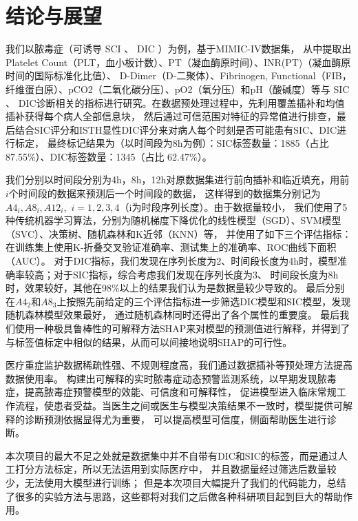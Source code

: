 \documentclass[12pt, a4paper, oneside]{ctexart}
\numberwithin{equation}{section}  %
\begin{document}
\section{结论与展望}
我们以脓毒症（可诱导 SCI 、 DIC ）为例，基于MIMIC-IV数据集，
从中提取出Platelet Count（PLT，血小板计数）、PT（凝血酶原时间）、INR(PT)（凝血酶原时间的国际标准化比值）、
D-Dimer（D-二聚体）、Fibrinogen, Functional（FIB，纤维蛋白原）、pCO2（二氧化碳分压）、pO2（氧分压）和pH（酸碱度）等与 SIC 、
 DIC诊断相关的指标进行研究。在数据预处理过程中，先利用覆盖插补和均值插补获得每个病人全部信息块，
 然后通过可信范围对特征的异常值进行排查，最后结合SIC评分和ISTH显性DIC评分来对病人每个时刻是否可能患有SIC、DIC进行标定，
 最终标记结果为（以时间段为8h为例）：SIC标签数量：1885（占比 87.55\%）、DIC标签数量：1345（占比 62.47\%）。

我们分别以时间段分别为4h，8h，12h对原数据集进行前向插补和临近填充，用前$i$个时间段的数据来预测后一个时间段的数据，
这样得到的数据集分别记为$A4_i,A8_i,A12_i,$
$i=1,2,3,4$（i为时段序列长度）。由于数据量较小，
我们使用了5种传统机器学习算法，分别为随机梯度下降优化的线性模型（SGD）、SVM模型（SVC）、决策树、随机森林和K近邻（KNN）等，
并使用了如下三个评估指标：在训练集上使用K-折叠交叉验证准确率、测试集上的准确率、ROC曲线下面积（AUC）。
对于DIC指标，我们发现在序列长度为2、时间段长度为4h时，模型准确率较高；对于SIC指标，综合考虑我们发现在序列长度为3、
时间段长度为8h时，效果较好，其他在98\%以上的结果我们认为是数据量较少导致的。
最后分别在$A4_2$和$A8_3$上按照先前给定的三个评估指标进一步筛选DIC模型和SIC模型，发现随机森林模型效果最好，
通过随机森林同时还得出了各个属性的重要度。
最后我们使用一种极具鲁棒性的可解释方法SHAP来对模型的预测值进行解释，并得到了与标签值标定中相似的结果，从而可以间接地说明SHAP的可行性。

医疗重症监护数据稀疏性强、不规则程度高，我们通过数据插补等预处理方法提高数据使用率。
构建出可解释的实时脓毒症动态预警监测系统，以早期发现脓毒症，提高脓毒症预警模型的效能、可信度和可解释性，
促进模型进入临床常规工作流程，使患者受益。当医生之间或医生与模型决策结果不一致时，模型提供可解释的诊断预测依据显得尤为重要，
可以提高模型可信度，侧面帮助医生进行诊断。

本次项目的最大不足之处就是数据集中并不自带有DIC和SIC的标签，而是通过人工打分方法标定，所以无法运用到实际医疗中，
并且数据量经过筛选后数量较少，无法使用大模型进行训练；
但是本次项目大幅提升了我们的代码能力，总结了很多的实验方法与思路，这些都将对我们之后做各种科研项目起到巨大的帮助作用。
\end{document}
